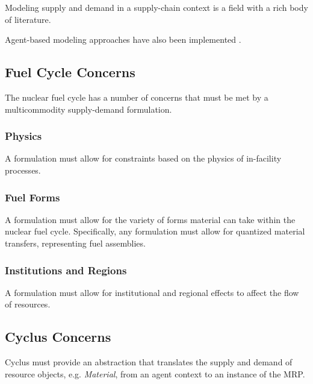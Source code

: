 Modeling supply and demand in a supply-chain context is a field with a rich body
of literature.

Agent-based modeling approaches have also been implemented \cite{julka_agent-based_2002}.

\subsection{Fuel Cycle Concerns}

The nuclear fuel cycle has a number of concerns that must be met by a
multicommodity supply-demand formulation.

\subsubsection{Physics}

A formulation must allow for constraints based on the physics of in-facility processes. 


\subsubsection{Fuel Forms}

A formulation must allow for the variety of forms material can take within the
nuclear fuel cycle. Specifically, any formulation must allow for quantized
material transfers, representing fuel assemblies.


\subsubsection{Institutions and Regions}

A formulation must allow for institutional and regional effects to affect the flow of resources.


\subsection{Cyclus Concerns}

Cyclus must provide an abstraction that translates the supply and demand of
resource objects, e.g. \textit{Material}, from an agent context to an instance
of the MRP. 

